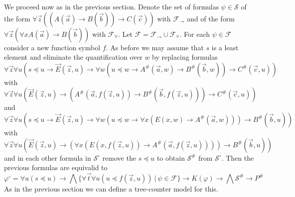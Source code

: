 \documentclass[a4paper,12pt]{report}
\theoremstyle{definition}
\theoremstyle{definition}
\theoremstyle{definition}
\theoremstyle{definition}
\theoremstyle{definition}
\theoremstyle{definition}
\theoremstyle{definition}
\begin{document}
	We proceed now as in the previous section. Denote the set of formulas $\psi\in\mathcal S$ of the form $\forall\vec z((A(\vec a)\to B(\vec b))\to C(\vec c))$ with $\mathcal F_\to$ and of the form $\forall \vec z(\forall xA(\vec a)\to B(\vec b))$ with $\mathcal F_\forall$. Let $\mathcal F = \mathcal F_\to\cup\mathcal F_\forall$. For each  $\psi\in\mathcal F$ consider a new function symbol $f$. As before we may assume that $s$ is a least element and eliminate the quantification over $w$ by replacing formulas
	$$\forall \vec z\forall u(s\preceq u\to\vec E(\vec z, u)\to \forall w(u\preceq w\to A^\#(\vec a, w)\to B^\#(\vec b, w))\to C^\#(\vec c, u))$$ with
	$$\forall \vec z\forall u(\vec E(\vec z, u)\to (A^\#(\vec a, f(\vec z, u))\to B^\#(\vec b, f(\vec z, u)))\to C^\#(\vec c, u))$$ and
	$$\forall \vec z\forall u(s\preceq u\to\vec E(\vec z, u)\to \forall w(u\preceq w\to \forall x(E(x, w)\to A^\#(\vec a, w)))\to B^\#(\vec b, u))$$ with $$\forall \vec z\forall u(\vec E(\vec z, u)\to (\forall x(E(x, f(\vec z, u))\to A^\#(\vec a, f(\vec z, u))))\to B^\#(\vec b, u))$$
	and in each other formula in $\mathcal S^\circ$ remove the $s\preceq u$ to obtain $\mathcal S^\#$ from $\mathcal S^\circ$. Then the previous formulas are equivalid to
	$$\varphi^\circ= \forall u(s\preceq u)\to \bigwedge\{\forall \vec t\forall u(u\preceq f(\vec z, u))\:|\:\psi\in\mathcal F\}\to K(\varphi)\to\bigwedge\mathcal S^\#\to P^\#$$
	As in the previous section we can define a tree-counter model for this.
\end{document}
